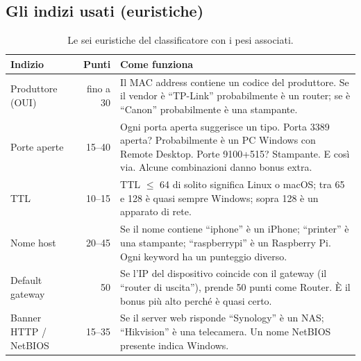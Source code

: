 \documentclass[a4paper,11pt]{article}
\begin{document}
\subsection{Gli indizi usati (euristiche)}

\begin{table}[H]
\centering
\small
\begin{tabularx}{\textwidth}{lrX}
  \toprule
  \textbf{Indizio} & \textbf{Punti} & \textbf{Come funziona} \\
  \midrule
  Produttore (OUI) & fino a 30  & Il MAC address contiene un codice del
                                   produttore.  Se il vendor è ``TP-Link''
                                   probabilmente è un router; se è ``Canon''
                                   probabilmente è una stampante. \\[3pt]
  Porte aperte      & 15--40     & Ogni porta aperta suggerisce un tipo.
                                   Porta 3389 aperta? Probabilmente è un
                                   PC Windows con Remote Desktop.
                                   Porte 9100+515? Stampante.  E così via.
                                   Alcune combinazioni danno bonus extra. \\[3pt]
  TTL               & 10--15     & TTL $\leq$ 64 di solito significa Linux o
                                   macOS; tra 65 e 128 è quasi sempre
                                   Windows; sopra 128 è un apparato di rete. \\[3pt]
  Nome host         & 20--45     & Se il nome contiene ``iphone'' è un iPhone;
                                   ``printer'' è una stampante; ``raspberrypi''
                                   è un Raspberry Pi.  Ogni keyword ha un
                                   punteggio diverso. \\[3pt]
  Default gateway   & 50         & Se l'IP del dispositivo coincide con il
                                   gateway (il ``router di uscita''), prende
                                   50 punti come Router.  È il bonus più
                                   alto perché è quasi certo. \\[3pt]
  Banner HTTP / NetBIOS & 15--35 & Se il server web risponde ``Synology'' è un NAS; ``Hikvision'' è una telecamera. Un nome NetBIOS presente indica Windows. \\
  \bottomrule
\end{tabularx}
\caption{Le sei euristiche del classificatore con i pesi associati.}
\end{table}
\end{document}
